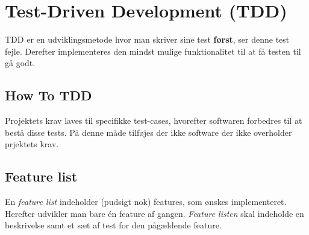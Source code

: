 \section{Test-Driven Development (TDD)}

TDD er en udviklingsmetode hvor man skriver sine test \textbf{først}, ser denne test fejle. Derefter implementeres den mindst mulige funktionalitet til at få testen til gå godt.

\subsection{How To TDD}
Projektets krav laves til specifikke test-cases, hvorefter softwaren forbedres til at bestå disse tests. På denne måde tilføjes der ikke software der ikke overholder prjektets krav.

%

\subsection{Feature list}
En \textit{feature list} indeholder (pudsigt nok) features, som ønskes implementeret. Herefter udvikler man bare én feature af gangen. \textit{Feature listen} skal indeholde en beskrivelse samt et sæt af test for den pågældende feature.


